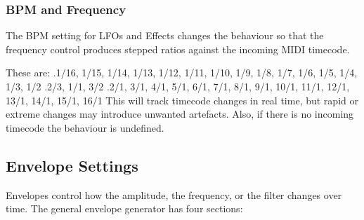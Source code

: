 \begin{flushleft}
  \begin{minipage}{\textwidth}
   \subsubsection{BPM and Frequency}
   \label{subsubsec:bpm_and_frequency}
   The BPM setting for LFOs and Effects changes the behaviour so that the frequency control produces
   stepped ratios against the incoming MIDI timecode.

   These are: \newline
    .\hspace{3em}1/16, 1/15, 1/14, 1/13, 1/12, 1/11, 1/10, 1/9, 1/8, 1/7, 1/6, 1/5, 1/4, 1/3, 1/2 \newline
    .\hspace{3em}2/3, 1/1, 3/2 \newline
    .\hspace{3em}2/1, 3/1, 4/1, 5/1, 6/1, 7/1, 8/1, 9/1, 10/1, 11/1, 12/1, 13/1, 14/1, 15/1, 16/1 \newline
    This will track timecode changes in real time, but rapid or extreme changes may
    introduce unwanted artefacts. Also, if there is no incoming timecode the behaviour
    is undefined.
  \end{minipage}
\end{flushleft}

\subsection{Envelope Settings}
\label{subsec:envelope_settings}

   Envelopes control how the amplitude, the frequency, or the filter changes
   over time.  The general envelope generator has four sections:

